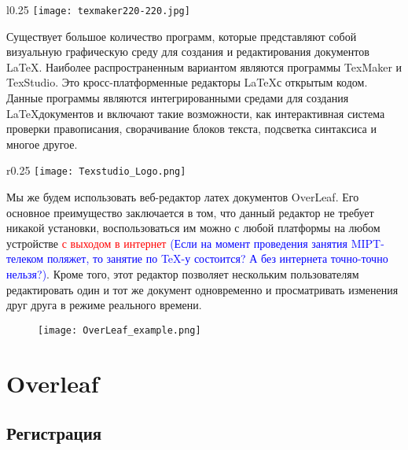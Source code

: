     \begin{wrapfigure}{l}{0.25\textwidth}
        \centering
        \texttt{[image: texmaker220-220.jpg]}
        \caption{}
    \end{wrapfigure}

    Существует большое количество программ, которые представляют собой визуальную графическую среду для создания и редактирования документов \LaTeX.
    Наиболее распространенным вариантом являются программы TexMaker и TexStudio. Это кросс-платформенные редакторы \LaTeX с открытым кодом. Данные программы являются интегрированными средами для создания \LaTeX документов и включают такие возможности, как интерактивная система проверки правописания, сворачивание блоков текста, подсветка синтаксиса и многое другое.

    \begin{wrapfigure}{r}{0.25\textwidth}
        \centering
        \texttt{[image: Texstudio\_Logo.png]}
        \caption{}
    \end{wrapfigure}



    Мы же будем использовать веб-редактор латех документов OverLeaf. Его основное преимущество заключается в том, что данный редактор не требует никакой установки, воспользоваться им можно с любой платформы на любом устройстве \textcolor{Red}{с выходом в интернет} \textcolor{Blue}{(Если на момент проведения занятия MIPT-телеком поляжет, то занятие по TeX-у состоится? А без интернета точно-точно нельзя?)}.
    Кроме того, этот редактор позволяет нескольким пользователям редактировать один и тот же документ одновременно и просматривать изменения друг друга в режиме реального времени.

    \begin{figure}[h!]
        \centering
        \texttt{[image: OverLeaf\_example.png]}
        \caption{}
        \label{OverLeaf_example}
    \end{figure}

    \section{Overleaf}

    \subsection{Регистрация}

